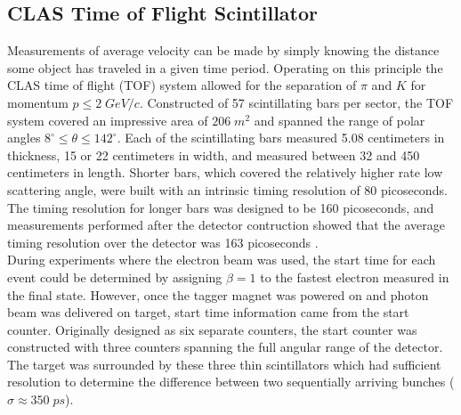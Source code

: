 \subsection{CLAS Time of Flight Scintillator}
Measurements of average velocity can be made by simply knowing the distance some object has traveled in a given time period.  Operating on this principle the CLAS time of flight (TOF) system allowed for the separation of $\pi$ and $K$ for momentum $p \leq 2 \; GeV/c$.  Constructed of 57 scintillating bars per sector, the TOF system covered an impressive area of $206 \; m^2$ and spanned the range of polar angles $8^\circ \leq \theta \leq 142^\circ$.  Each of the scintillating bars measured 5.08 centimeters in thickness, 15 or 22 centimeters in width, and measured between 32 and 450 centimeters in length.  Shorter bars, which covered the relatively higher rate low scattering angle, were built with an intrinsic timing resolution of 80 picoseconds.  The timing resolution for longer bars was designed to be 160 picoseconds, and measurements performed after the detector contruction showed that the average timing resolution over the detector was 163 picoseconds \cite{hardware-smith:1999}.\\
During experiments where the electron beam was used, the start time for each event could be determined by assigning $\beta = 1$ to the fastest electron measured in the final state.  However, once the tagger magnet was powered on and photon beam was delivered on target, start time information came from the start counter.  Originally designed as six separate counters, the start counter was constructed with three counters spanning the full angular range of the detector.  The target was surrounded by these three thin scintillators which had sufficient resolution to determine the difference between two sequentially arriving bunches ($\sigma \approx 350 \; ps$). 

